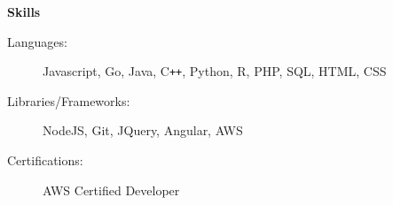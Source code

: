 \documentclass[letterpaper,11pt]{article}
\newcommand{\resheading}[1]{{\large \colorbox{mygrey}{\begin{minipage}{\textwidth}{\textbf{#1 \vphantom{p\^{E}}}}\end{minipage}}}}
\begin{document}
\begin{itemize}
\vspace{0.1in}
\end{itemize}

\resheading{Skills}

\begin{description}
\item[Languages:]
Javascript, Go, Java, C{}\verb!++!, Python, R, PHP, SQL, HTML, CSS
\item[Libraries/Frameworks:]
NodeJS, Git, JQuery, Angular,  AWS
\item[Certifications:]
AWS Certified Developer

\end{description}
\end{document}
